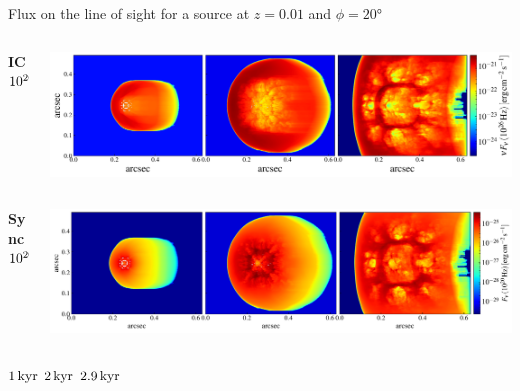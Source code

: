 \begin{frame}{Flux on the line of sight for a source at $z=0.01$ and $\phi=20$°}
	\begin{columns}
		\begin{column}{0.1\textwidth}
				{\small {\bf IC} \\$10^{26}\,{\rm Hz}$  }
		\end{column}
		\begin{column}{\textwidth}
	\includegraphics[width=\linewidth]{images/inte_flux_26_ic_5_10_15.pdf}
		\end{column}
	\end{columns}
	\begin{columns}
		\begin{column}{0.1\textwidth}
				{\small{\bf Sync} \\ $10^{20}\,{\rm Hz}$}
		\end{column}
		\begin{column}{\textwidth}
            \includegraphics[width=\linewidth]{images/inte_flux_20_sync_5_10_15.pdf}
		\end{column}
	\end{columns}
	\vspace{8pt}
		\hspace{70pt} $1\,{\rm kyr}$ \hspace{60pt} $2\,{\rm kyr}$ \hspace{60pt} $2.9\,{\rm kyr}$
\end{frame}

